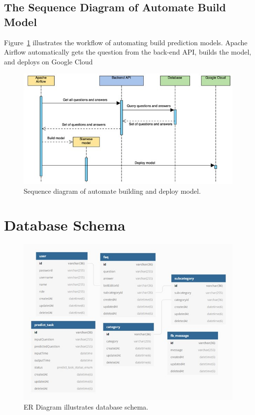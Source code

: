 \documentclass[12pt,oneside,openright,a4paper]{cpe-english-project}
\begin{document}
\pagebreak

\subsection{The Sequence Diagram of Automate Build Model}
Figure~\ref*{fig:Sequence diagram of automate building and deploy model} illustrates the workflow of automating build prediction models. Apache Airflow automatically gets the question from the back-end API, builds the model, and deploys on Google Cloud
\begin{figure}[!h]
	\includegraphics[width=14cm]{img/ch3/sequence diagram of automate build model.jpg}
	\caption{Sequence diagram of automate building and deploy model.}\label{fig:Sequence diagram of automate building and deploy model}
\end{figure}

\section{Database Schema}
\label{ch2_database_schema}
\begin{figure}[!h]
	\includegraphics[width=14cm]{img/ch3/Database Schema.jpg}
	\caption{ER Diagram illustrates database schema.}\label{fig:ER Diagram illustrates database schema}
\end{figure}
\end{document}
